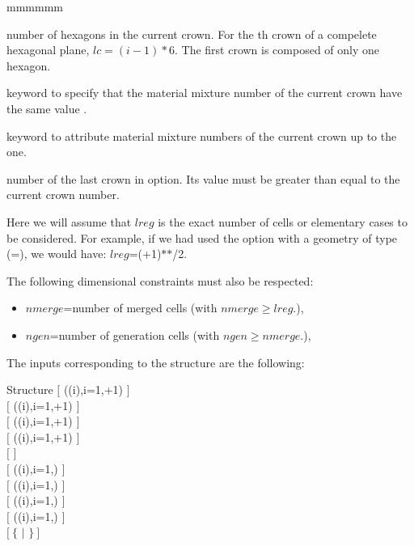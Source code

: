 \begin{ListeDeDescription}{mmmmmm}
\item[\dusa{lc}] number of hexagons in the current crown. For the th crown of a compelete hexagonal plane, 
$lc=(i-1)*6$. The first crown is composed of only one hexagon. 

\item[\moc{ALL}] keyword to specify that the  material mixture number of the current crown have the same value 
. 

\item[\moc{UPTO}] keyword to attribute material mixture numbers of the current crown up to the  one. 

\item[\dusa{ic}] number of the last crown in  option. Its value must be greater than equal to the current 
crown number. 

\end{ListeDeDescription}

Here we will assume that $lreg$ is the exact number of cells  or
elementary cases to be considered. For example, if we had used the 
option with a geometry of type  (=), we would
have: $lreg$=(+1)$*$$*$/2.

\vskip 0.2cm

The following dimensional constraints must also be respected:

\begin{itemize}

\item $nmerge$=number of merged cells (with $nmerge \ge lreg$.),
\item $ngen$=number of generation cells (with $ngen \ge nmerge$.),

\end{itemize}

The inputs corresponding to the  structure are the following:

\begin{DataStructure}{Structure }
$[$  ((i),i=1,+1) $]$\\
$[$  ((i),i=1,+1) $]$\\
$[$  ((i),i=1,+1) $]$\\
$[$  ((i),i=1,+1) $]$\\
$[$   $]$\\
$[$  ((i),i=1,) $]$\\
$[$  ((i),i=1,) $]$\\
$[$  ((i),i=1,) $]$\\
$[$  ((i),i=1,) $]$\\
$[~\{$   $|$   $\}~]$
\end{DataStructure}

